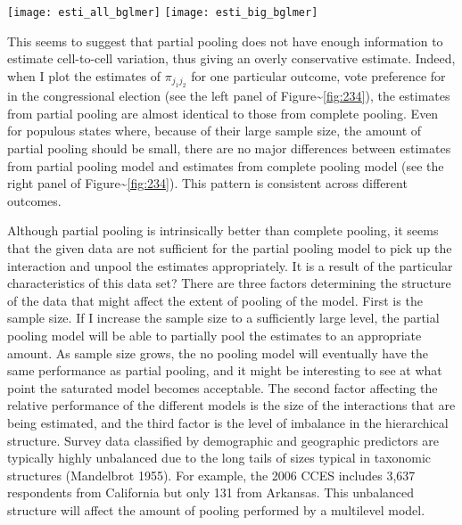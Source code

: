 \begin{figure*}[p!]
  \centering
  \texttt{[image: esti\_all\_bglmer]}
  \texttt{[image: esti\_big\_bglmer]}
  \caption{\em Left panel: Cell proportion estimates for three models of vote
    intention. Each line is a state. The
    partial pooling model pools so much that it is indistinguishable from
    complete pooling. Right panel: The same estimates for the 10 most populous
    states. Still, partial pooling estimates are similar to complete pooling
    estimates.}
  \label{fig:234}
\end{figure*}

This seems to suggest that partial pooling does not have enough
information to estimate cell-to-cell variation, thus giving an overly
conservative estimate. Indeed, when I plot the estimates of
\(\pi_{j_1j_2}\) for one particular outcome, vote preference for in the
congressional election (see the left panel of
Figure\textasciitilde{}\ref{fig:234}), the estimates from partial
pooling are almost identical to those from complete pooling. Even for
populous states where, because of their large sample size, the amount of
partial pooling should be small, there are no major differences between
estimates from partial pooling model and estimates from complete pooling
model (see the right panel of Figure\textasciitilde{}\ref{fig:234}).
This pattern is consistent across different outcomes.

Although partial pooling is intrinsically better than complete
pooling, it seems that the given data are not sufficient for the partial
pooling model to pick up the interaction and unpool the estimates
appropriately. It is a result of the particular characteristics of this
data set? There are three factors determining the structure of the data
that might affect the extent of pooling of the model. First is the
sample size. If I increase the sample size to a sufficiently large
level, the partial pooling model will be able to partially pool the
estimates to an appropriate amount. As sample size grows, the no pooling
model will eventually have the same performance as partial pooling, and
it might be interesting to see at what point the saturated model becomes
acceptable. The second factor affecting the relative performance of the
different models is the size of the interactions that are being
estimated, and the third factor is the level of imbalance in the
hierarchical structure. Survey data classified by demographic and
geographic predictors are typically highly unbalanced due to the long
tails of sizes typical in taxonomic structures (Mandelbrot 1955). For
example, the 2006 CCES includes 3,637 respondents from California but
only 131 from Arkansas. This unbalanced structure will affect the amount
of pooling performed by a multilevel model.

